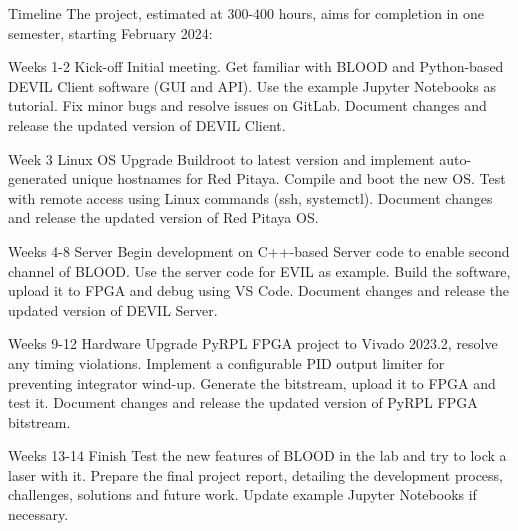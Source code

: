 \documentclass{project-proposal}
\begin{document}
\begin{sectiontimeline}{Timeline}
    The project, estimated at 300-400 hours, aims for completion in one semester,
    starting February 2024:

    \timelineentry
    {Weeks 1-2}
    {Kick-off}
    {
        Initial meeting. Get familiar with BLOOD and Python-based DEVIL Client software
        (GUI and API). Use the example Jupyter Notebooks as tutorial. Fix minor bugs
        and resolve issues on GitLab. Document changes and release the updated version
        of DEVIL Client.
    }

    \timelineentryspacer

    \timelineentry
    {Week 3}
    {Linux OS}
    {
        Upgrade Buildroot to latest version and implement auto-generated unique
        hostnames for Red Pitaya. Compile and boot the new OS. Test with remote
        access using Linux commands (ssh, systemctl). Document changes and release the
        updated version of Red Pitaya OS.
    }

    \timelineentryspacer

    \timelineentry
    {Weeks 4-8}
    {Server}
    {
        Begin development on C++-based Server code to enable second channel of BLOOD.
        Use the server code for EVIL as example. Build the software, upload it to FPGA
        and debug using VS Code. Document changes and release the updated version of
        DEVIL Server.
    }

    \newpage

    \timelineentry
    {Weeks 9-12}
    {Hardware}
    {
        Upgrade PyRPL FPGA project to Vivado 2023.2, resolve any timing violations.
        Implement a configurable PID output limiter for preventing integrator wind-up.
        Generate the bitstream, upload it to FPGA and test it. Document changes and
        release the updated version of PyRPL FPGA bitstream.
    }

    \timelineentryspacer

    \timelineentry
    {Weeks 13-14}
    {Finish}
    {
        Test the new features of BLOOD in the lab and try to lock a laser with it.
        Prepare the final project report, detailing the development process, challenges,
        solutions and future work. Update example Jupyter Notebooks if necessary.
    }
\end{sectiontimeline}
\end{document}
